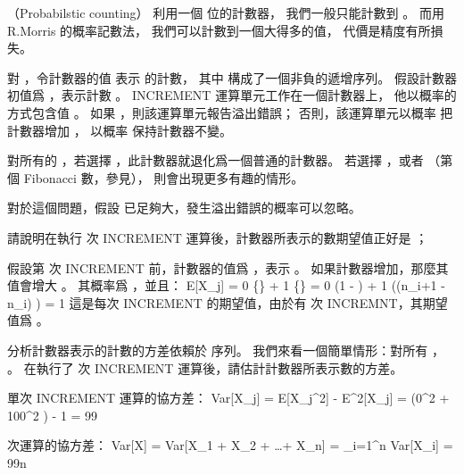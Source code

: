 \startsubject[
  title={Problems},
]

\startPROBLEM（Probabilstic counting）
利用一個  位的計數器，
我們一般只能計數到 。
而用 R.Morris 的{\EMP 概率記數法}，
我們可以計數到一個大得多的值，
代價是精度有所損失。

對 ，令計數器的值  表示  的計數，
其中  構成了一個非負的遞增序列。
假設計數器初值爲 ，表示計數 。
INCREMENT 運算單元工作在一個計數器上，
他以概率的方式包含值 。
如果 ，則該運算單元報告溢出錯誤；
否則，該運算單元以概率  把計數器增加 ，
以概率  保持計數器不變。

對所有的 ，若選擇 ，此計數器就退化爲一個普通的計數器。
若選擇 ，或者 （第  個 Fibonacci 數，參見\insection[notationfunction]），
則會出現更多有趣的情形。

對於這個問題，假設  已足夠大，發生溢出錯誤的概率可以忽略。

\startigBase[a]
\item 請說明在執行  次 INCREMENT 運算後，計數器所表示的數期望值正好是 ；

\startANSWER
假設第  次 INCREMENT 前，計數器的值爲 ，表示 。
如果計數器增加，那麼其值會增大 。
其概率爲 ，並且：
\startformula\startmathalignment
\NC E[X_j] \NC= 0 \cdot \Pr\{\} + 1 \cdot \Pr\{\} \NR
\NC        \NC= 0 \cdot \left(1 - \right) +
                1 \cdot \left((n_{i+1} - n_i) \cdot {}\right) \NR
\NC        \NC= 1 \NR
\stopmathalignment\stopformula
這是每次 INCREMENT 的期望值，由於有  次 INCREMNT，其期望值爲 。
\stopANSWER

\item 分析計數器表示的計數的方差依賴於  序列。
我們來看一個簡單情形：對所有 ， 。
在執行了  次 INCREMENT 運算後，請估計計數器所表示數的方差。

\startANSWER
單次 INCREMENT 運算的協方差：
\startformula\startmathalignment
\NC Var[X_j] \NC= E[X_j^2] - E^2[X_j] \NR
\NC           \NC= \left(0^2 \cdot {} + 100^2 \right) - 1 \NR
\NC           \NC= 99 \NR
\stopmathalignment\stopformula

 次運算的協方差：
\startformula
Var[X] = Var[X_1 + X_2 + \ldots + X_n] = \sum_{i=1}^n Var[X_i] = 99n
\stopformula
\stopANSWER
\stopigBase
\stopPROBLEM

